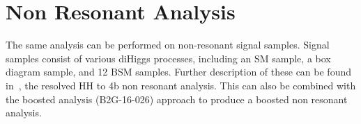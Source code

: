 \section{Non Resonant Analysis\label{app:NR}}

The same analysis can be performed on non-resonant signal samples. Signal samples consist of various diHiggs processes, including an SM sample, a box diagram sample, and 12 BSM samples. Further description of these can be found in~\cite{CMS-PAS-HIG-17-017}, the resolved HH to 4b non resonant analysis. This can also be combined with the boosted analysis (B2G-16-026) approach to produce a boosted non resonant analysis.
